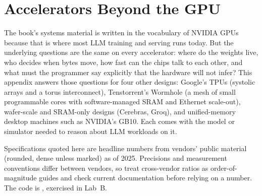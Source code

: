 \chapter{Accelerators Beyond the GPU}\label{app:accel}

The book's systems material is written in the vocabulary of NVIDIA GPUs because that is where
most LLM training and serving runs today. But the underlying questions are the same on every
accelerator: where do the weights live, who decides when bytes move, how fast can the chips
talk to each other, and what must the programmer say explicitly that the hardware will not
infer? This appendix answers those questions for four other designs: Google's TPUs (systolic
arrays and a torus interconnect), Tenstorrent's Wormhole (a mesh of small programmable cores with
software-managed SRAM and Ethernet scale-out), wafer-scale and SRAM-only designs (Cerebras,
Groq), and unified-memory desktop machines such as NVIDIA's GB10. Each comes with the model or
simulator needed to reason about LLM workloads on it.

Specifications quoted here are headline numbers from vendors' public material (rounded, dense
unless marked) as of 2025. Precisions and measurement conventions differ between vendors, so treat
cross-vendor ratios as order-of-magnitude guides and check current documentation before relying
on a number. The code is , exercised in Lab~B.

